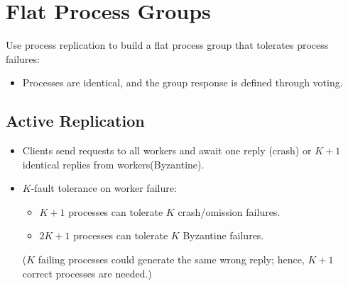 \section{Flat Process Groups}
Use process replication to build a flat process group that tolerates process failures:
\begin{itemize}
    \item Processes are identical, and the group response is defined through voting.
\end{itemize}
\subsection{Active Replication}
\begin{itemize}
    \item Clients send requests to all workers and await one reply (crash) or \( K + 1 \) identical replies from workers(Byzantine).
 
    
    \item \( K \)-fault tolerance on worker failure:
    \begin{itemize}
        \item \( K + 1 \) processes can tolerate \( K \) crash/omission failures.
        \item \( 2K + 1 \) processes can tolerate \( K \) Byzantine failures.
    \end{itemize}
(\( K \) failing processes could generate the same wrong reply; hence, \( K + 1 \) correct processes are needed.)
\end{itemize}

